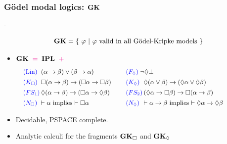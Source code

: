 \begin{frame}
  \frametitle{G\"odel modal logics: $\mathbf{GK}$}

   \BSK
  {} - 

  
  \[
  \mathbf{GK}=\{~\varphi~|~\varphi~\mbox{valid in all G\"odel-Kripke models}~\}
  \]

  \SP
    \begin{itemize}
  \item  %
    $  \mathbf{GK}\;\;{\color{magenta} =}\;\; \mathbf{IPL} \;\;{\color{magenta} +}\;\; $
    \begin{custombox}[top=0mm,bottom=0mm,width=33em]
\[\small
  \begin{tabular}{m{1.5em}m{12em}m{1.5em}m{16em}}
    \\[-3.5ex]
  \tb{(Lin)}  &   $(\a\to \b)\lor (\b\to\a)$         & $\tb{(F_\Diam)}\; \neg \Diam\bot$ 
\\[1ex]
  $\tb{(K_\Box)}$ & $\Box(\a \to \b)\to (\Box\a\to \Box \b)$ & 
  $\tb{(K_\Diam)}$ & $\Diam(\a \lor \b)\to (\Diam\a\lor \Diam \b)$
  \\[1ex]
  $\tb{(FS_1)}$ & $\Diam(\a \to \b)\to (\Box\a\to \Diam \b)$ & 
  $\tb{(FS_2)}$ & $(\Diam \a \to\Box \b)\to \Box(\a\to  \b)$
  \\[1ex]
  $\tb{(N_\Box)}$ & $\vdash \a$ implies $\vdash \Box\a$ &
  $\tb{(N_\Diam)}$ & $\vdash \a\to \b$ implies $\vdash \Diam \a\to\Diam\b$
\end{tabular}
\]
\end{custombox}

    



\medskip
    \item
Decidable, PSPACE complete.

\smallskip
{}


\medskip
    \item  %
Analytic calculi for the fragments   $\mathbf{GK}_\Box$ and $\mathbf{GK}_\Diamond$

\smallskip
{}
    
    \end{itemize}


 \VFILL

\end{frame}


